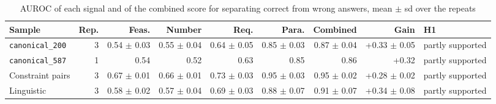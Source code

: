 \begin{table}[t]
\centering
\caption{AUROC of each signal and of the combined score for separating correct from wrong answers, mean $\pm$ sd over the repeats}
\label{tab:gap1}
\footnotesize
\begin{tabular}{@{}lrrrrrrrl@{}}
\toprule
Sample & Rep. & Feas. & Number & Req. & Para. & Combined & Gain & H1 \\
\midrule
\texttt{canonical\_200} & 3 & 0.54 $\pm$ 0.03 & 0.55 $\pm$ 0.04 & 0.64 $\pm$ 0.05 & 0.85 $\pm$ 0.03 & 0.87 $\pm$ 0.04 & +0.33 $\pm$ 0.05 & partly supported \\
\texttt{canonical\_587} & 1 & 0.54 & 0.52 & 0.63 & 0.85 & 0.86 & +0.32 & partly supported \\
Constraint pairs & 3 & 0.67 $\pm$ 0.01 & 0.66 $\pm$ 0.01 & 0.73 $\pm$ 0.03 & 0.95 $\pm$ 0.03 & 0.95 $\pm$ 0.02 & +0.28 $\pm$ 0.02 & partly supported \\
Linguistic & 3 & 0.58 $\pm$ 0.02 & 0.57 $\pm$ 0.04 & 0.69 $\pm$ 0.03 & 0.88 $\pm$ 0.07 & 0.91 $\pm$ 0.07 & +0.34 $\pm$ 0.08 & partly supported \\
\bottomrule
\end{tabular}
\end{table}
